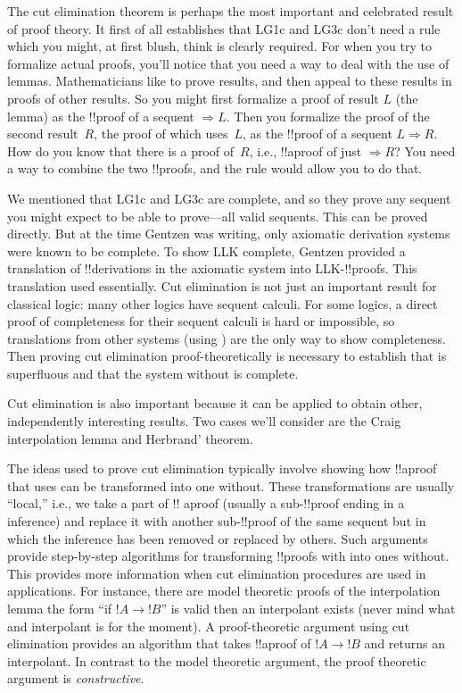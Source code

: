 \documentclass[10pt,a4paper]{article}
\theoremstyle{plain}
\theoremstyle{definition}
\theoremstyle{remark}
\providecommand{\lif}{\mathbin{\rightarrow}}
\providecommand{\Sequent}{\mathrel{\Rightarrow}}
\providecommand{\Log}{\ensuremath{\mathrm{L}}}
\providecommand{\Cut}{\mathrm{Cut}}
\begin{document}
The cut elimination theorem is perhaps the most important and
celebrated result of proof theory. It first of all establishes that
\Log{G1c} and \Log{G3c} don't need a rule which you might, at first
blush, think is clearly required. For when you try to formalize actual
proofs, you'll notice that you need a way to deal with the use of
lemmas. Mathematicians like to prove results, and then appeal to these
results in proofs of other results. So you might first formalize a
proof of result $L$ (the lemma) as the !!{proof} of a sequent
$\Sequent L$. Then you formalize the proof of the second result~$R$,
the proof of which uses~$L$, as the !!{proof} of a sequent $L \Sequent
R$. How do you know that there is a proof of~$R$, i.e., !!a{proof} of
just $\Sequent R$? You need a way to combine the two !!{proof}s, and
the \Cut{} rule would allow you to do that.

We mentioned that \Log{G1c} and \Log{G3c} are complete, and so they
prove any sequent you might expect to be able to prove---all valid
sequents. This can be proved directly. But at the time Gentzen was
writing, only axiomatic derivation systems were known to be complete.
To show \Log{LK} complete, Gentzen provided a translation of
!!{derivation}s in the axiomatic system into \Log{LK}-!!{proof}s. This
translation used \Cut{} essentially. Cut elimination is not just an
important result for classical logic: many other logics have sequent
calculi. For some logics, a direct proof of completeness for their
sequent calculi is hard or impossible, so translations from other
systems (using \Cut) are the only way to show completeness. Then
proving cut elimination proof-theoretically is necessary to establish
that \Cut{} is superfluous and that the system without \Cut{} is
complete.

Cut elimination is also important because it can be applied to obtain
other, independently interesting results. Two cases we'll consider are
the Craig interpolation lemma and Herbrand' theorem.

The ideas used to prove cut elimination typically involve showing how
!!a{proof} that uses \Cut{} can be transformed into one without. These
transformations are usually ``local,'' i.e., we take a part of !!
a{proof} (usually a sub-!!{proof} ending in a \Cut{} inference) and
replace it with another sub-!!{proof} of the same sequent but in which
the \Cut{} inference has been removed or replaced by others. Such
arguments provide step-by-step algorithms for transforming !!{proof}s
with \Cut{} into ones without. This provides more information when cut
elimination procedures are used in applications. For instance, there
are model theoretic proofs of the interpolation lemma the form ``if
$!A \lif !B$'' is valid then an interpolant exists (never mind what
and interpolant is for the moment). A proof-theoretic argument using
cut elimination provides an algorithm that takes !!a{proof} of $!A
\lif !B$ and returns an interpolant. In contrast to the model
theoretic argument, the proof theoretic argument is
\emph{constructive}.
\end{document}

